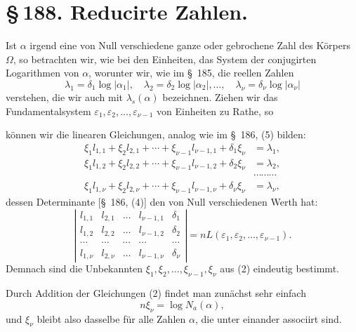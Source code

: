 \documentclass[11pt]{article}
\newcommand{\Na}{N_a}
\begin{document}
\section*{\S\,188. Reducirte Zahlen.}

Ist $\alpha$ irgend eine von Null verschiedene ganze oder gebrochene Zahl des Körpers $\Omega$, so betrachten wir, wie bei den Einheiten, das System der conjugirten Logarithmen von $\alpha$, worunter wir, wie im \S~185, die reellen Zahlen
\begin{equation}
\lambda_1=\delta_1\log|\alpha_1|,\quad
\lambda_2=\delta_2\log|\alpha_2|,\ldots,\quad
\lambda_\nu=\delta_\nu\log|\alpha_\nu|
\tag{1}
\end{equation}
verstehen, die wir auch mit $\lambda_s(\alpha)$ bezeichnen. Ziehen wir das Fundamentalsystem $\varepsilon_1,\varepsilon_2,\ldots,\varepsilon_{\nu-1}$ von Einheiten zu Rathe, so

können wir die linearen Gleichungen, analog wie im \S~186, (5) bilden:
\begin{equation}
\begin{aligned}
\xi_1l_{1,1}+\xi_2l_{2,1}+\cdots+\xi_{\nu-1}l_{\nu-1,1}+\delta_1\xi_\nu&=\lambda_1,\\
\xi_1l_{1,2}+\xi_2l_{2,2}+\cdots+\xi_{\nu-1}l_{\nu-1,2}+\delta_2\xi_\nu&=\lambda_2,\\
&\cdots\cdots\cdots\\
\xi_1l_{1,\nu}+\xi_2l_{2,\nu}+\cdots+\xi_{\nu-1}l_{\nu-1,\nu}+\delta_\nu\xi_\nu&=\lambda_\nu,
\end{aligned}
\tag{2}
\end{equation}
dessen Determinante [\S~186, (4)] den von Null verschiedenen Werth hat:
\begin{equation}
\left|
\begin{array}{ccccc}
l_{1,1}&l_{2,1}&\ldots&l_{\nu-1,1}&\delta_1\\
l_{1,2}&l_{2,2}&\ldots&l_{\nu-1,2}&\delta_2\\
\cdots&\cdots&\cdots&\cdots&\cdots\\
l_{1,\nu}&l_{2,\nu}&\ldots&l_{\nu-1,\nu}&\delta_\nu
\end{array}
\right|=nL(\varepsilon_1,\varepsilon_2,\ldots,\varepsilon_{\nu-1}).
\tag{3}
\end{equation}
Demnach sind die Unbekannten $\xi_1,\xi_2,\ldots,\xi_{\nu-1},\xi_\nu$ aus (2) eindeutig bestimmt.

Durch Addition der Gleichungen (2) findet man zunächst sehr einfach
\begin{equation}
n\xi_\nu=\log \Na(\alpha),
\tag{4}
\end{equation}
und $\xi_\nu$ bleibt also dasselbe für alle Zahlen $\alpha$, die unter einander associirt sind.
\end{document}
